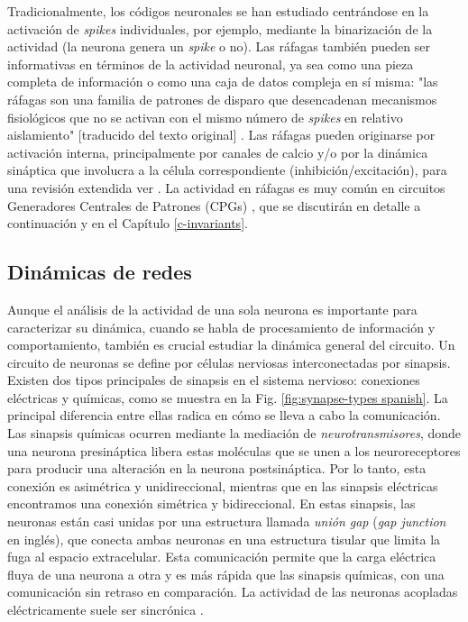 Tradicionalmente, los códigos neuronales se han estudiado centrándose en la activación de \textit{spikes} individuales, por ejemplo, mediante la binarización de la actividad (la neurona genera un \textit{spike} o no). Las ráfagas también pueden ser informativas en términos de la actividad neuronal, ya sea como una pieza completa de información o como una caja de datos compleja en sí misma: "las ráfagas son una familia de patrones de disparo que desencadenan mecanismos fisiológicos que no se activan con el mismo número de \textit{spikes} en relativo aislamiento" [traducido del texto original] \parencite{friedenberger_silences_2023}. Las ráfagas pueden originarse por activación interna, principalmente por canales de calcio y/o por la dinámica sináptica que involucra a la célula correspondiente (inhibición/excitación), para una revisión extendida ver \parencite{friedenberger_silences_2023}. La actividad en ráfagas es muy común en circuitos Generadores Centrales de Patrones (CPGs) \parencite{katz_evolution_2016,steuer_central_2018}, que se discutirán en detalle a continuación y en el Capítulo \ref{c-invariants}.

\subsection{Dinámicas de redes}

Aunque el análisis de la actividad de una sola neurona es importante para caracterizar su dinámica, cuando se habla de procesamiento de información y comportamiento, también es crucial estudiar la dinámica general del circuito. Un circuito de neuronas se define por células nerviosas interconectadas por sinapsis. Existen dos tipos principales de sinapsis en el sistema nervioso: conexiones eléctricas y químicas, como se muestra en la Fig. \ref{fig:synapse-types spanish}. La principal diferencia entre ellas radica en cómo se lleva a cabo la comunicación. Las sinapsis químicas ocurren mediante la mediación de \textit{neurotransmisores}, donde una neurona presináptica libera estas moléculas que se unen a los neuroreceptores para producir una alteración en la neurona postsináptica. Por lo tanto, esta conexión es asimétrica y unidireccional, mientras que en las sinapsis eléctricas encontramos una conexión simétrica y bidireccional. En estas sinapsis, las neuronas están casi unidas por una estructura llamada \textit{unión gap} (\textit{gap junction} en inglés), que conecta ambas neuronas en una estructura tisular que limita la fuga al espacio extracelular. Esta comunicación permite que la carga eléctrica fluya de una neurona a otra y es más rápida que las sinapsis químicas, con una comunicación sin retraso en comparación. La actividad de las neuronas acopladas eléctricamente suele ser sincrónica \parencite{levitan_neuron_2002}.

